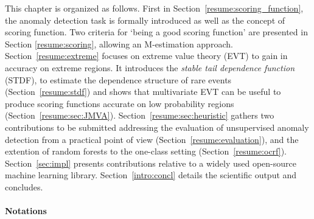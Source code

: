 This chapter is organized as follows.
First in Section~\ref{resume:scoring_function}, the anomaly detection task is formally introduced as well as the concept of scoring function. 
Two criteria for `being a good scoring function' are presented in Section \ref{resume:scoring}, allowing an M-estimation approach. 
Section~\ref{resume:extreme} focuses on extreme value theory (EVT) to gain in accuracy on extreme regions. It introduces the \emph{stable tail dependence function} (STDF), to estimate the dependence structure of rare events (Section~\ref{resume:stdf}) and shows that multivariate EVT can be useful to produce scoring functions accurate on low probability regions (Section~\ref{resume:sec:JMVA}).
Section~\ref{resume:sec:heuristic} gathers two contributions to be submitted addressing the evaluation of unsupervised anomaly detection from a practical point of view (Section~\ref{resume:evaluation}), and the extention of random forests to the one-class setting (Section~\ref{resume:ocrf}). Section~\ref{sec:impl} presents contributions relative to a widely used open-source machine learning library. Section~\ref{intro:concl} details the scientific output and concludes.



\paragraph{Notations}

